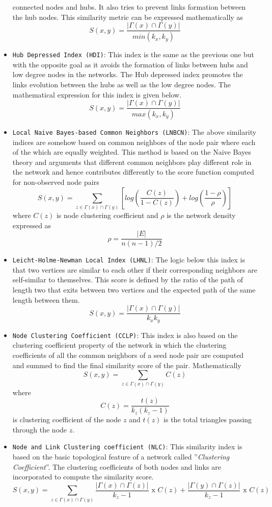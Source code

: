 \begin{itemize}
          connected nodes and hubs. It also tries to prevent links formation
          between the hub nodes. This similarity metric can be expressed
          mathematically as
          \[S(x, y) = \frac{|\Gamma(x) \cap \Gamma(y)|}{min(k_x, k_y)}\]
    \item \texttt{Hub\ Depressed\ Index\ (HDI)}: This index is the same as the
          previous one but with the opposite goal as it avoids the formation of
          links between hubs and low degree nodes in the networks. The Hub
          depressed index promotes the links evolution between the hubs as well as
          the low degree nodes. The mathematical expression for this index is
          given below.
          \[S(x, y) = \frac{|\Gamma(x) \cap \Gamma(y)|}{max(k_x, k_y)}\]
    \item \texttt{Local\ Naive\ Bayes-based\ Common\ Neighbors\ (LNBCN)}: The
          above similarity indices are somehow based on common neighbors of the
          node pair where each of the which are equally weighted. This method is
          based on the Naive Bayes theory and arguments that different common
          neighbors play different role in the network and hence contributes
          differently to the score function computed for non-observed node pairs
          \[S(x, y) = \sum_{z \in \Gamma(x) \cap \Gamma(y)} [log(\frac{C(z)}{1 - C(z)}) + log(\frac{1 - \rho}{\rho})]\]
          where \(C(z)\) is node clustering coefficient and \(\rho\) is the
          network density expressed as \[\rho = \frac{|E|}{n(n-1)/2}\]
    \item \texttt{Leicht-Holme-Newman\ Local\ Index\ (LHNL)}: The logic below this
          index is that two vertices are similar to each other if their
          corresponding neighbors are self-similar to themselves. This score is
          defined by the ratio of the path of length two that exits between two
          vertices and the expected path of the same length between them.
          \[S(x, y) = \frac{|\Gamma(x) \cap \Gamma(y)|}{k_x k_y}\]
    \item \texttt{Node\ Clustering\ Coefficient\ (CCLP)}: This index is also based
          on the clustering coefficient property of the network in which the
          clustering coefficients of all the common neighbors of a seed node pair
          are computed and summed to find the final similarity score of the pair.
          Mathematically \[S(x, y) = \sum_{z \in \Gamma(x) \cap \Gamma(y)} C(z)\]
          where \[C(z) = \frac{t(z)}{k_z(k_z - 1)}\] is clustering coefficient of
          the node \(z\) and \(t(z)\) is the total triangles passing through the
          node \(z\).
    \item \texttt{Node\ and\ Link\ Clustering\ coefficient\ (NLC)}:
          This similarity index is based on the basic topological feature of a
          network called ''\emph{Clustering Coefficient}''. The clustering
          coefficients of both nodes and links are incorporated to compute the
          similarity score.
          \[S(x, y) = \sum_{z \in \Gamma(x) \cap \Gamma(y)} \frac{|\Gamma(x) \cap \Gamma(z)|}{k_z -1} \text{ x }C(z) + \frac{|\Gamma(y) \cap \Gamma(z)|}{k_z -1} \text{ x }C(z)\]

\end{itemize}

